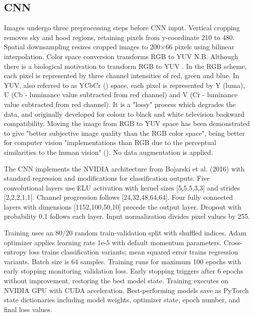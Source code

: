 \subsection{CNN}
Images undergo three preprocessing steps before CNN input. Vertical cropping removes sky and hood regions, retaining pixels from y-coordinate 210 to 480. Spatial downsampling resizes cropped images to 200×66 pixels using bilinear interpolation. Color space conversion transforms RGB to YUV \cite{lecun2004dave, bojarski2016end} N.B. Although there is a biological motivation to transform RGB to YUV \cite{podpora2014yuv}. In the RGB scheme, each pixel is represented by three channel intensities of red, green and blue. In YUV, also referred to as YCbCr (\cite{maller2020}) space, each pixel is represented by Y (luma), U (Cb - luminance value subtracted from red channel) and V (Cr - luminance value subtracted from red channel). It is a "lossy" process which degrades the data, and originally developed for colour to black and white television backward compatibility. Moving the image from RGB to YUV space has been demonstrated to give "better subjective image quality than the RGB color space", being better for computer vision "implementations than RGB due to the perceptual similarities to the human vision" (\cite{podpora2014yuv}). No data augmentation is applied. 

The CNN implements the NVIDIA architecture from Bojarski et al. (2016) \cite{bojarski2016end} with standard regression and modifications for classification outputs. Five convolutional layers use ELU activation with kernel sizes [5,5,5,3,3] and strides [2,2,2,1,1]. Channel progression follows [24,32,48,64,64]. Four fully connected layers with dimensions [1152,100,50,10] precede the output layer. Dropout with probability 0.1 follows each layer. Input normalization divides pixel values by 255.

Training uses an 80/20 random train-validation split with shuffled indices. Adam optimizer applies learning rate 1e-5 with default momentum parameters. Cross-entropy loss trains classification variants; mean squared error trains regression variants. Batch size is 64 samples. Training runs for maximum 100 epochs with early stopping monitoring validation loss. Early stopping triggers after 6 epochs without improvement, restoring the best model state. Training executes on NVIDIA GPU with CUDA acceleration. Best-performing models save as PyTorch state dictionaries including model weights, optimizer state, epoch number, and final loss values.


